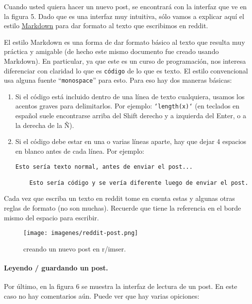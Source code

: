 \documentclass[]{article}
\makeatletter
\def\maxwidth{\ifdim\Gin@nat@width>\linewidth\linewidth
\else\Gin@nat@width\fi}
\let\Oldincludegraphics\includegraphics
\renewcommand{\includegraphics}[1]{\Oldincludegraphics[width=\maxwidth]{#1}}
\makeatother
\begin{document}
Cuando usted quiera hacer un nuevo post, se encontrará con la interfaz
que ve en la figura 5. Dado que es una interfaz muy intuitiva, sólo
vamos a explicar aquí el estilo
\href{http://daringfireball.net/projects/markdown/syntax}{Markdown} para
dar formato al texto que escribimos en reddit.

El estilo Markdown es una forma de dar formato básico al texto que
resulta muy práctica y amigable (de hecho este mismo documento fue
creado usando Markdown). En particular, ya que este es un curso de
programación, nos interesa diferenciar con claridad lo que es
\texttt{código} de lo que es texto. El estilo convencional usa alguna
fuente ``\texttt{monospace}'' para esto. Para eso hay dos maneras
básicas:

\begin{enumerate}[1.]
\item
  Si el código está incluido dentro de una línea de texto cualquiera,
  usamos los acentos graves para delimitarlos. Por ejemplo:
  \texttt{`length(x)`} (en teclados en español suele encontrarse arriba
  del Shift derecho y a izquierda del Enter, o a la derecha de la Ñ).
\item
  Si el código debe estar en una o varias líneas aparte, hay que dejar 4
  espacios en blanco antes de cada línea. Por ejemplo:

\begin{verbatim}
Esto sería texto normal, antes de enviar el post...

    Esto sería código y se vería diferente luego de enviar el post.
\end{verbatim}
\end{enumerate}
Cada vez que escriba un texto en reddit tome en cuenta estas y algunas
otras reglas de formato (no son muchas). Recuerde que tiene la
referencia en el borde mismo del espacio para escribir.

\begin{figure}[htbp]
\centering
\texttt{[image: imagenes/reddit-post.png]}
\caption{creando un nuevo post en r/imser.}
\end{figure}

\paragraph{Leyendo / guardando un post.}

Por último, en la figura 6 se muestra la interfaz de lectura de un post.
En este caso no hay comentarios aún. Puede ver que hay varias opiciones:
\end{document}
